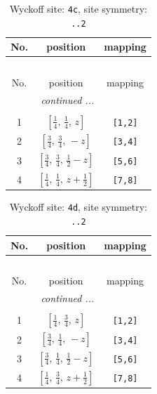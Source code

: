 \documentclass[fleqn,8pt]{jsarticle}
\begin{document}
\renewcommand{\arraystretch}{1.2}
\begin{longtable}{ccc}
\caption{Wyckoff site: {\tt 4c}, site symmetry: {\tt ..2}}
 \\
 \hline \hline
No. & position & mapping \\ \hline \endfirsthead

\multicolumn{2}{l}{\tablename\ \thetable{}} \\
 \hline \hline
No. & position & mapping \\ \hline \endhead

 \hline \hline
\multicolumn{2}{r}{\footnotesize\it continued ...} \\ \endfoot

 \hline \hline
\multicolumn{2}{r}{} \\ \endlastfoot

1 & $\left[ \frac{1}{4},\, \frac{1}{4},\, z \right]$ & {\tt [1,2]} \\ \hline
2 & $\left[ \frac{3}{4},\, \frac{3}{4},\, - z \right]$ & {\tt [3,4]} \\ \hline
3 & $\left[ \frac{3}{4},\, \frac{3}{4},\, \frac{1}{2} - z \right]$ & {\tt [5,6]} \\ \hline
4 & $\left[ \frac{1}{4},\, \frac{1}{4},\, z + \frac{1}{2} \right]$ & {\tt [7,8]} \\
\end{longtable}
\renewcommand{\arraystretch}{1.2}
\begin{longtable}{ccc}
\caption{Wyckoff site: {\tt 4d}, site symmetry: {\tt ..2}}
 \\
 \hline \hline
No. & position & mapping \\ \hline \endfirsthead

\multicolumn{2}{l}{\tablename\ \thetable{}} \\
 \hline \hline
No. & position & mapping \\ \hline \endhead

 \hline \hline
\multicolumn{2}{r}{\footnotesize\it continued ...} \\ \endfoot

 \hline \hline
\multicolumn{2}{r}{} \\ \endlastfoot

1 & $\left[ \frac{1}{4},\, \frac{3}{4},\, z \right]$ & {\tt [1,2]} \\ \hline
2 & $\left[ \frac{3}{4},\, \frac{1}{4},\, - z \right]$ & {\tt [3,4]} \\ \hline
3 & $\left[ \frac{3}{4},\, \frac{1}{4},\, \frac{1}{2} - z \right]$ & {\tt [5,6]} \\ \hline
4 & $\left[ \frac{1}{4},\, \frac{3}{4},\, z + \frac{1}{2} \right]$ & {\tt [7,8]} \\
\end{longtable}
\end{document}
